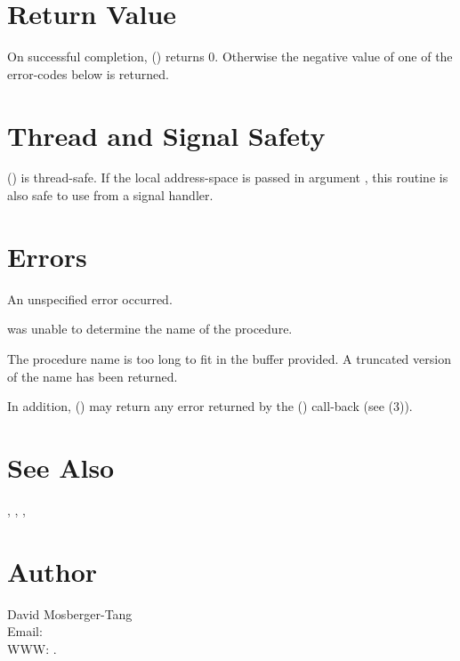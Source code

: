 \documentclass{article}
\begin{document}
\section{Return Value}

On successful completion, ()
returns 0.  Otherwise the negative value of one of the error-codes
below is returned.

\section{Thread and Signal Safety}

() is thread-safe.  If the local
address-space is passed in argument , this routine is also
safe to use from a signal handler.

\section{Errors}

\begin{Description}
\item[\Const{UNW\_EUNSPEC}] An unspecified error occurred.
\item[\Const{UNW\_ENOINFO}]  was unable to determine
  the name of the procedure.
\item[\Const{UNW\_ENOMEM}] The procedure name is too long to fit
  in the buffer provided.  A truncated version of the name has been
  returned.
\end{Description}
In addition, () may return any error
returned by the () call-back (see
(3)).

\section{See Also}

,
,
,

\section{Author}

\noindent
David Mosberger-Tang\\
Email: \\
WWW: .
\LatexManEnd
\end{document}
